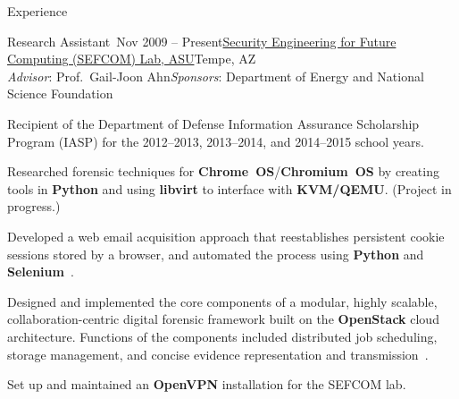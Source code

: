 
\begin{rSection}{Experience}


\begin{rSubsection}{Research Assistant~}{Nov 2009 -- Present}{\href{http://sefcom.asu.edu/}{Security Engineering for Future Computing (SEFCOM) Lab, ASU}}{Tempe, AZ\\{\textnormal{\textit{Advisor}: Prof.\ Gail-Joon Ahn\hfill \textit{Sponsors}: Department of Energy and National Science Foundation}}}

  \item Recipient of the Department of Defense Information Assurance Scholarship Program (IASP) for the 2012--2013, 2013--2014, and 2014--2015 school years.

  \item Researched forensic techniques for \textbf{Chrome~OS}/\textbf{Chromium~OS} by creating tools in \textbf{Python} and using \textbf{libvirt} to interface with \textbf{KVM/QEMU}. (Project in progress.)

  \item Developed a web email acquisition approach that reestablishes persistent cookie sessions stored by a browser, and automated the process using \textbf{Python} and \textbf{Selenium}~\cite{Paglierani2013}.

  \item Designed and implemented the core components of a modular, highly scalable, collaboration-centric digital forensic framework built on the \textbf{OpenStack} cloud architecture. Functions of the components included distributed job scheduling, storage management, and concise evidence representation and transmission~\cite{Mabey2011a,Mabey2011}.

  \item Set up and maintained an \textbf{OpenVPN} installation for the SEFCOM lab.



\end{rSubsection}
\end{rSection}
